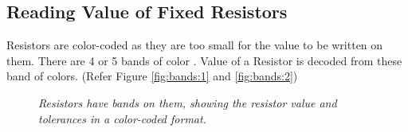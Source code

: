 	\subsection{Reading Value of Fixed Resistors}
		Resistors are color-coded as they are too small for the value to be written on them.
		There are 4 or 5 bands of color . Value of a Resistor is decoded from these band of colors. (Refer Figure \ref{fig:bands:1} and \ref{fig:bands:2})
		\begin{figure}[ht]
			\centering 
			\hfill
			\vfill
			\hfill
			\caption{\textit{Resistors have bands on them, showing the resistor value and tolerances in a color-coded format.}}
		\end{figure}
		
